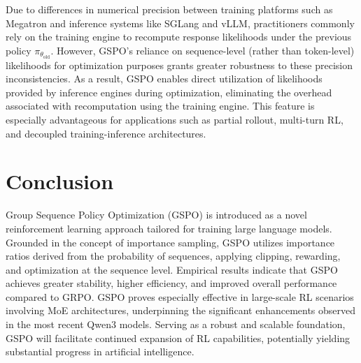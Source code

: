 Due to differences in numerical precision between training platforms such as Megatron and inference systems like SGLang and vLLM, practitioners commonly rely on the training engine to recompute response likelihoods under the previous policy $\pi_{\theta_\text{old}}$. However, GSPO’s reliance on sequence-level (rather than token-level) likelihoods for optimization purposes grants greater robustness to these precision inconsistencies. As a result, GSPO enables direct utilization of likelihoods provided by inference engines during optimization, eliminating the overhead associated with recomputation using the training engine. This feature is especially advantageous for applications such as partial rollout, multi-turn RL, and decoupled training-inference architectures.

\section{Conclusion}

Group Sequence Policy Optimization (GSPO) is introduced as a novel reinforcement learning approach tailored for training large language models. Grounded in the concept of importance sampling, GSPO utilizes importance ratios derived from the probability of sequences, applying clipping, rewarding, and optimization at the sequence level. Empirical results indicate that GSPO achieves greater stability, higher efficiency, and improved overall performance compared to GRPO. GSPO proves especially effective in large-scale RL scenarios involving MoE architectures, underpinning the significant enhancements observed in the most recent Qwen3 models. Serving as a robust and scalable foundation, GSPO will facilitate continued expansion of RL capabilities, potentially yielding substantial progress in artificial intelligence.

